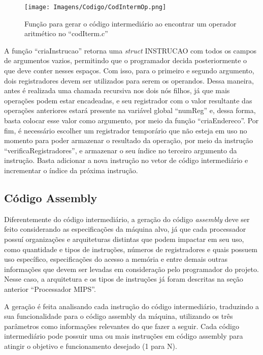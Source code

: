 \documentclass[
	12pt,				%
	oneside,
	a4paper,			%
	english,			%
	french,				%
	spanish,			%
	brazil,				%
	]{abntex2}
\begin{document}
\begin{figure}[H]
\centering 
\caption{Função para gerar o código intermediário ao encontrar um operador aritmético no \nohyphens{``codIterm.c''}} 
\label{fig:CodIntermOp}
\graphicspath{ {./Imagens/} } 
\texttt{[image: Imagens/Codigo/CodIntermOp.png]}
\end{figure}


A função ``criaInstrucao'' retorna uma \emph{struct} INSTRUCAO com todos os campos de argumentos vazios, permitindo que o programador decida posteriormente o que deve conter nesses espaços. Com isso, para o primeiro e segundo argumento, dois registradores devem ser utilizados para serem os operandos. Dessa maneira, antes é realizada uma chamada recursiva nos dois nós filhos, já que mais operações podem estar encadeadas, e seu registrador com o valor resultante das operações anteriores estará presente na variável global ``numReg'' e, dessa forma, basta colocar esse valor como argumento, por meio da função ``criaEndereco''. Por fim, é necessário escolher um registrador temporário que não esteja em uso no momento para poder armazenar o resultado da operação, por meio da instrução ``verificaRegistradores'', e armazenar o seu índice no terceiro argumento da instrução. Basta adicionar a nova instrução no vetor de código intermediário e incrementar o índice da próxima instrução.



\subsection{Código Assembly}

Diferentemente do código intermediário, a geração do código \emph{assembly} deve ser feito considerando as especificações da máquina alvo, já que cada processador possuí organizações e arquiteturas distintas que podem impactar em seu uso, como quantidade e tipos de instruções, números de registradores e quais possuem uso específico, especificações do acesso a memória e entre demais outras informações que devem ser levadas em consideração pelo programador do projeto. Nesse caso, a arquitetura e os tipos de instruções já foram descritas na seção anterior ``Processador MIPS''.

A geração é feita analisando cada instrução do código intermediário, traduzindo a sua funcionalidade para o código assembly da máquina, utilizando os três parâmetros como informações relevantes do que fazer a seguir. Cada código intermediário pode possuir uma ou mais instruções em código assembly para atingir o objetivo e funcionamento desejado (1 para N).
\end{document}
